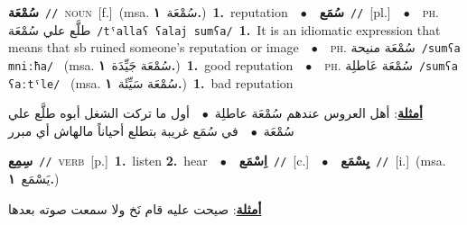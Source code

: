 \documentclass[10pt,a4paper,twoside]{article} %
\begin{document}
\begin{multicols}{2}
{\setlength\topsep{0pt}\textbf{\foreignlanguage{arabic}{سُمْعَة}}\ {\color{gray}\texttt{//}\color{black}}\ \textsc{noun}\ [f.]\ \color{gray}(msa. \foreignlanguage{arabic}{سُمْعَة}~\foreignlanguage{arabic}{\textbf{١.}})\color{black}\ \textbf{1.}~reputation\ \ $\bullet$\ \ \setlength\topsep{0pt}\textbf{\foreignlanguage{arabic}{سُمَع}}\ {\color{gray}\texttt{//}\color{black}}\ [pl.]\ \ $\bullet$\ \ \textsc{ph.} \color{gray} \foreignlanguage{arabic}{طلَّع علي سُمْعَة}\color{black}\ {\color{gray}\texttt{/{\sffamily tˤallaʕ ʕalaj sumʕa}/}\color{black}}\ \textbf{1.}~It is an idiomatic expression that means that sb ruined someone's reputation or image\ \ $\bullet$\ \ \textsc{ph.} \color{gray} \foreignlanguage{arabic}{سُمْعَة منيحة}\color{black}\ {\color{gray}\texttt{/{\sffamily sumʕa mniːħa}/}\color{black}}\ \color{gray} (msa. \foreignlanguage{arabic}{سُمْعَة جَيِّدَة}~\foreignlanguage{arabic}{\textbf{١.}})\color{black}\ \textbf{1.}~good reputation\ \ $\bullet$\ \ \textsc{ph.} \color{gray} \foreignlanguage{arabic}{سُمْعَة عَاطلِة}\color{black}\ {\color{gray}\texttt{/{\sffamily sumʕa ʕaːtˤle}/}\color{black}}\ \color{gray} (msa. \foreignlanguage{arabic}{سُمْعَة سَيِّئَة}~\foreignlanguage{arabic}{\textbf{١.}})\color{black}\ \textbf{1.}~bad reputation\  \begin{flushright}\color{gray}\foreignlanguage{arabic}{\textbf{\underline{\foreignlanguage{arabic}{أمثلة}}}: أهل العروس عندهم سُمْعَة عاطلِة\ $\bullet$\ \  أول ما تركت الشغل أبوه طلَّع علي سُمْعَة\ $\bullet$\ \  في سُمَع غريبة بتطلع أحياناً مالهاش أي مبرر}\end{flushright}\color{black}} \vspace{2mm}

{\setlength\topsep{0pt}\textbf{\foreignlanguage{arabic}{سِمِع}}\ {\color{gray}\texttt{//}\color{black}}\ \textsc{verb}\ [p.]\ \textbf{1.}~listen  \textbf{2.}~hear\ \ $\bullet$\ \ \setlength\topsep{0pt}\textbf{\foreignlanguage{arabic}{اِسْمَع}}\ {\color{gray}\texttt{//}\color{black}}\ [c.]\ \ $\bullet$\ \ \setlength\topsep{0pt}\textbf{\foreignlanguage{arabic}{يِسْمَع}}\ {\color{gray}\texttt{//}\color{black}}\ [i.]\ \color{gray}(msa. \foreignlanguage{arabic}{يَسْمَع}~\foreignlanguage{arabic}{\textbf{١.}})\color{black}\  \begin{flushright}\color{gray}\foreignlanguage{arabic}{\textbf{\underline{\foreignlanguage{arabic}{أمثلة}}}: صيحت عليه قام نَخ ولا سمعت صوته بعدها}\end{flushright}\color{black}} \vspace{2mm}


\end{multicols}
\end{document}
